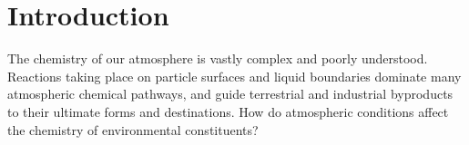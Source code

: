 \section {Introduction}

The chemistry of our atmosphere is vastly complex and poorly understood. Reactions taking place on particle surfaces and liquid boundaries dominate many atmospheric chemical pathways, and guide terrestrial and industrial byproducts to their ultimate forms and destinations. How do atmospheric conditions affect the chemistry of environmental constituents? 
